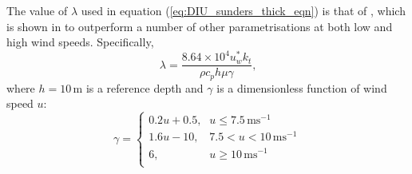 \documentclass[../main/NEMO_manual]{subfiles}
\begin{document}
The value of $\lambda$ used in equation (\autoref{eq:DIU_sunders_thick_eqn}) is that of \citet{artale.iudicone.ea_JGR02},
which is shown in \citet{tu.tsuang_GRL05} to outperform a number of other parametrisations at
both low and high wind speeds.
Specifically,
\[
  \lambda = \frac{ 8.64\times10^4 u^*_{w} k_t }{ \rho c_p h \mu \gamma }\mbox{,}
\]
where $h=10$\,m is a reference depth and
$\gamma$ is a dimensionless function of wind speed $u$:
\[
  \gamma =
  \begin{cases}
    0.2u+0.5\mbox{,} & u \le 7.5\,\mbox{ms}^{-1} \\
    1.6u-10\mbox{,} & 7.5 < u < 10\,\mbox{ms}^{-1} \\
    6\mbox{,} & u \ge 10\,\mbox{ms}^{-1} \\
  \end{cases}
\]

\subinc{}
\end{document}
